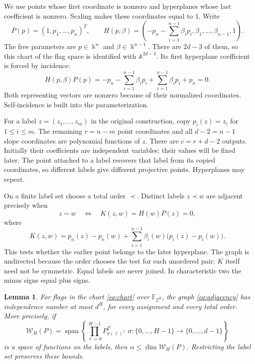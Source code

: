 \documentclass[11pt,a4paper]{article}
\newcommand{\F}{\mathbb F}
\newcommand{\A}{\mathbb A}
\newcommand{\Wcal}{\mathcal W}
\DeclareMathOperator{\spanop}{span}
\newtheorem{lemma}[theorem]{Lemma}
\theoremstyle{definition}
\theoremstyle{remark}
\numberwithin{equation}{section}
\begin{document}
We use points whose first coordinate is nonzero and hyperplanes whose last coefficient is nonzero. Scaling makes these coordinates equal to $1$. Write
\begin{equation}\label{eq:chart}
P(p)=(1,p_1,\ldots,p_n)^T,\qquad
H(p,\beta)=\left(-p_n-\sum_{i=1}^{n-1}\beta_i p_i,\beta_1,\ldots,\beta_{n-1},1\right).
\end{equation}
The free parameters are $p\in\Bbbk^n$ and $\beta\in\Bbbk^{n-1}$. There are $2d-3$ of them, so this chart of the flag space is identified with $\A^{2d-3}$. Its first hyperplane coefficient is forced by incidence:
\[
H(p,\beta)P(p)=-p_n-\sum_{i=1}^{n-1}\beta_i p_i+\sum_{i=1}^{n-1}\beta_i p_i+p_n=0.
\]
Both representing vectors are nonzero because of their normalized coordinates. Self-incidence is built into the parameterization.

For a label $z=(z_1,\ldots,z_m)$ in the original construction, copy $p_i(z)=z_i$ for $1\le i\le m$. The remaining $r=n-m$ point coordinates and all $d-2=n-1$ slope coordinates are polynomial functions of $z$. There are $c=r+d-2$ outputs. Initially their coefficients are independent variables; their values will be fixed later. The point attached to a label recovers that label from its copied coordinates, so different labels give different projective points. Hyperplanes may repeat.

On a finite label set choose a total order $\prec$. Distinct labels $z\prec w$ are adjacent precisely when
\begin{equation}\label{eq:adjacency}
z\sim w\quad\Longleftrightarrow\quad K(z,w)=H(w)P(z)=0,
\end{equation}
where
\begin{equation}\label{eq:kernel}
K(z,w)=p_n(z)-p_n(w)+\sum_{i=1}^{n-1}\beta_i(w)\bigl(p_i(z)-p_i(w)\bigr).
\end{equation}
This tests whether the earlier point belongs to the later hyperplane. The graph is undirected because the order chooses the test for each unordered pair; $K$ itself need not be symmetric. Equal labels are never joined. In characteristic two the minus signs equal plus signs.

\begin{lemma}\label{lem:rank}
For flags in the chart \eqref{eq:chart} over $\F_{2^H}$, the graph \eqref{eq:adjacency} has independence number at most $d^H$, for every assignment and every total order. More precisely, if
\begin{equation}\label{eq:feature-space}
\Wcal_H(P)=\spanop\left\{
\prod_{\ell=0}^{H-1}P_{\sigma(\ell)}^{2^\ell}:\
\sigma:\{0,\ldots,H-1\}\longrightarrow\{0,\ldots,d-1\}
\right\}
\end{equation}
is a space of functions on the labels, then $\alpha\le\dim\Wcal_H(P)$. Restricting the label set preserves these bounds.
\end{lemma}
\end{document}
